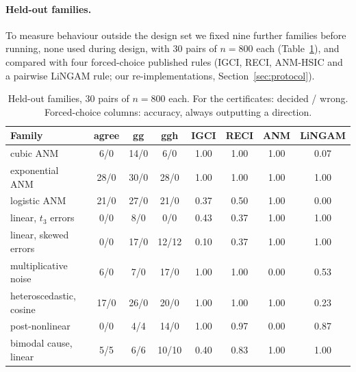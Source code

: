\paragraph{Held-out families.} To measure behaviour outside the design set we
fixed nine further families before running, none used during design, with $30$ pairs of $n=800$ each (Table~\ref{tab:heldout}), and compared
with four forced-choice published rules (IGCI, RECI, ANM-HSIC and a pairwise
LiNGAM rule; our re-implementations, Section~\ref{sec:protocol}).

\begin{table}[t]
\caption{Held-out families, $30$ pairs of $n=800$ each. For the certificates:
decided / wrong. Forced-choice columns: accuracy, always outputting a
direction.}\label{tab:heldout}
\small
\setlength{\tabcolsep}{3.5pt}
\begin{tabular}{@{}lccccccc@{}}
\toprule
Family & agree & gg & ggh & IGCI & RECI & ANM & LiNGAM\\
\midrule
cubic ANM & 6/0 & 14/0 & 6/0 & 1.00 & 1.00 & 1.00 & 0.07\\
exponential ANM & 28/0 & 30/0 & 28/0 & 1.00 & 1.00 & 1.00 & 1.00\\
logistic ANM & 21/0 & 27/0 & 21/0 & 0.37 & 0.50 & 1.00 & 0.00\\
linear, $t_3$ errors & 0/0 & 8/0 & 0/0 & 0.43 & 0.37 & 1.00 & 1.00\\
linear, skewed errors & 0/0 & 17/0 & 12/12 & 0.10 & 0.37 & 1.00 & 1.00\\
multiplicative noise & 6/0 & 7/0 & 17/0 & 1.00 & 1.00 & 0.00 & 0.53\\
heteroscedastic, cosine & 17/0 & 26/0 & 20/0 & 1.00 & 1.00 & 1.00 & 0.23\\
post-nonlinear & 0/0 & 4/4 & 14/0 & 1.00 & 0.97 & 0.00 & 0.87\\
bimodal cause, linear & 5/5 & 6/6 & 10/10 & 0.40 & 0.83 & 1.00 & 1.00\\
\bottomrule
\end{tabular}
\end{table}

